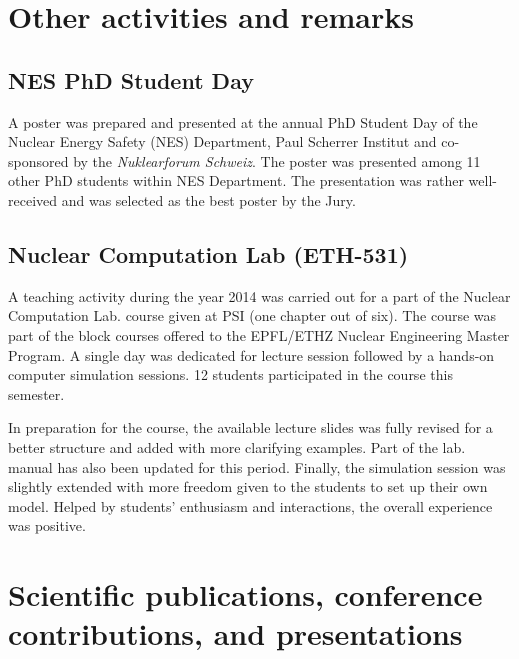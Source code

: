 \documentclass[11pt,titlepage]{article}
\begin{document}
\section{Other activities and remarks}

\subsection{NES PhD Student Day}

A poster was prepared and presented at the annual PhD Student Day of the 
Nuclear Energy Safety (NES) Department, Paul Scherrer Institut and co-sponsored 
by the \textit{Nuklearforum Schweiz}.
The poster \cite{Wicaksono2014b} was presented among 11 other PhD students 
within NES Department.
The presentation was rather well-received and was selected as the best 
poster by the Jury.


\subsection{Nuclear Computation Lab (ETH-531)}

A teaching activity during the year 2014 was carried out for a part of  
the Nuclear Computation Lab. course given at PSI (one chapter out of six).
The course was part of the block courses offered to the EPFL/ETHZ Nuclear
Engineering Master Program.
A single day was dedicated for lecture session followed by a hands-on 
computer simulation sessions.
12 students participated in the course this semester.

In preparation for the course, the available lecture slides was fully revised
for a better structure and added with more clarifying examples.
Part of the lab. manual has also been updated for this period.
Finally, the simulation session was slightly extended with more freedom 
given to the students to set up their own model.
Helped by students' enthusiasm and interactions, the overall experience was 
positive.

\section{Scientific publications, conference contributions, and presentations}

\nocite{Wicaksono2014a}
\nocite{Wicaksono2014b}
\nocite{Wicaksono2014c}
\nocite{Wicaksono2014d}
\nocite{Wicaksono2014e}
\printbibliography[heading=none]
\end{document}
